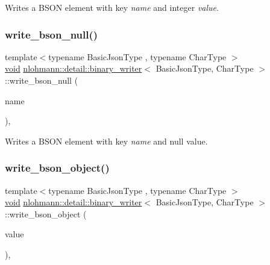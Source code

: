 Writes a B\+S\+ON element with key {\itshape name} and integer {\itshape value}. 

\mbox{\label{classnlohmann_1_1detail_1_1binary__writer_a9927c1110b18661e0224a76156e5a7a9}} 
\subsubsection{\texorpdfstring{write\+\_\+bson\+\_\+null()}{write\_bson\_null()}}
{\footnotesize\ttfamily template$<$typename Basic\+Json\+Type , typename Char\+Type $>$ \\
\hyperlink{namespacenlohmann_1_1detail_a59fca69799f6b9e366710cb9043aa77d}{void} \hyperlink{classnlohmann_1_1detail_1_1binary__writer}{nlohmann\+::detail\+::binary\+\_\+writer}$<$ Basic\+Json\+Type, Char\+Type $>$\+::write\+\_\+bson\+\_\+null (\begin{DoxyParamCaption}\item[{const \hyperlink{classnlohmann_1_1detail_1_1binary__writer_a29f2ae7a5c4a8c1dae47b3b2310de8a8}{string\+\_\+t} \&}]{name }\end{DoxyParamCaption})\hspace{0.3cm}{\ttfamily [inline]}, {\ttfamily [private]}}



Writes a B\+S\+ON element with key {\itshape name} and null value. 

\mbox{\label{classnlohmann_1_1detail_1_1binary__writer_a29b3e0f83a8e5f2307804023109ba2c9}} 
\subsubsection{\texorpdfstring{write\+\_\+bson\+\_\+object()}{write\_bson\_object()}}
{\footnotesize\ttfamily template$<$typename Basic\+Json\+Type , typename Char\+Type $>$ \\
\hyperlink{namespacenlohmann_1_1detail_a59fca69799f6b9e366710cb9043aa77d}{void} \hyperlink{classnlohmann_1_1detail_1_1binary__writer}{nlohmann\+::detail\+::binary\+\_\+writer}$<$ Basic\+Json\+Type, Char\+Type $>$\+::write\+\_\+bson\+\_\+object (\begin{DoxyParamCaption}\item[{const typename Basic\+Json\+Type\+::object\+\_\+t \&}]{value }\end{DoxyParamCaption})\hspace{0.3cm}{\ttfamily [inline]}, {\ttfamily [private]}}


